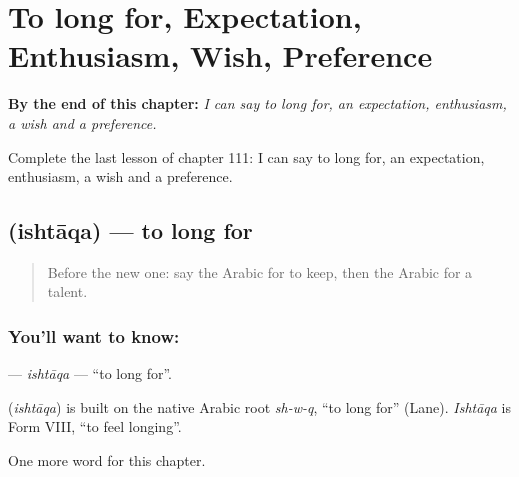 
\chapter{To long for, Expectation, Enthusiasm, Wish, Preference}
\label{ch:ar-to-long-for-expectation-enthusiasm-wish-preference}

\begin{chapteropening}
\textbf{By the end of this chapter:} \emph{I can say to long for, an expectation, enthusiasm, a wish and a preference.}

Complete the last lesson of chapter 111: I can say to long for, an expectation, enthusiasm, a wish and a preference.
\end{chapteropening}

\section[\texorpdfstring{\ar{اشتاق} (ishtāqa)}{اشتاق (ishtāqa)}]{ (ishtāqa) — to long for}

\label{lesson:AR-C111-ishtaqa}



\begin{quote}
Before the new one: say the Arabic for to keep, then the Arabic for a talent.
\end{quote}

\subsection*{You'll want to know: }
\textbf{} — \emph{ishtāqa} — \textquotedblleft{}to long for\textquotedblright{}.

\begin{cousinweb}
\textbf{} (\emph{ishtāqa}) is built on the native Arabic root \emph{sh-w-q}, \textquotedblleft{}to long for\textquotedblright{} (Lane). \emph{Ishtāqa} is Form VIII, \textquotedblleft{}to feel longing\textquotedblright{}.
\end{cousinweb}

\begin{grammarlens}[title={What you've built}]
One more word for this chapter.
\end{grammarlens}

